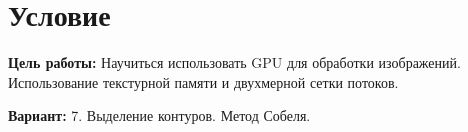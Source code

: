 \section{Условие}
{\bfseries Цель работы:} Научиться использовать GPU для обработки изображений.
Использование текстурной памяти и двухмерной сетки потоков.

{\bfseries Вариант:} 7. Выделение контуров. Метод Собеля.
